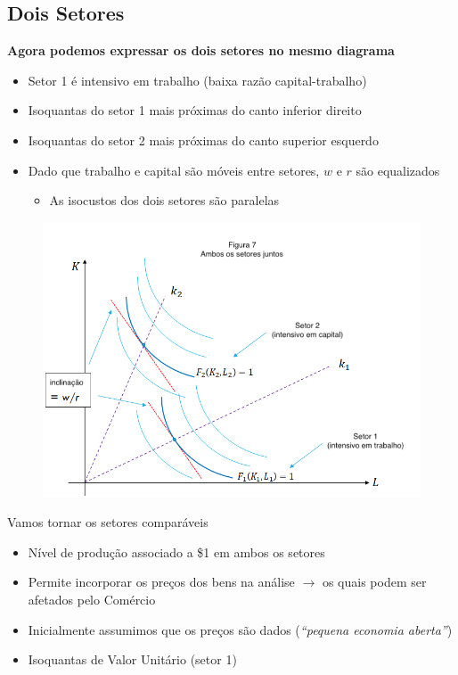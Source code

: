 \documentclass[a4paper,12pt]{article}[abntex2]
\begin{document}
\subsection{\textbf{Dois Setores}}
\textbf{Agora podemos expressar os dois setores no mesmo diagrama}\begin{itemize}
    \item Setor 1 é intensivo em trabalho (baixa razão capital-trabalho)
    \item Isoquantas do setor 1 mais próximas do canto inferior direito
    \item Isoquantas do setor 2 mais próximas do canto superior esquerdo
    \item Dado que trabalho e capital são móveis entre setores, \(w\) e \(r\) são equalizados\begin{itemize}
        \item As isocustos dos dois setores são paralelas
    \end{itemize}
\end{itemize}

\begin{figure}[H]
    \centering
    \includegraphics[width=0.7\linewidth]{Imagens/a10i7.png}
\end{figure}

Vamos tornar os setores comparáveis

\begin{itemize}
    \item Nível de produção associado a \$1 em ambos os setores
    \item Permite incorporar os preços dos bens na análise \(\rightarrow\) os quais podem ser afetados pelo Comércio
    \item Inicialmente assumimos que os preços são dados (\textit{``pequena economia aberta''})
    \item Isoquantas de Valor Unitário (setor 1)
\end{itemize}
\end{document}
